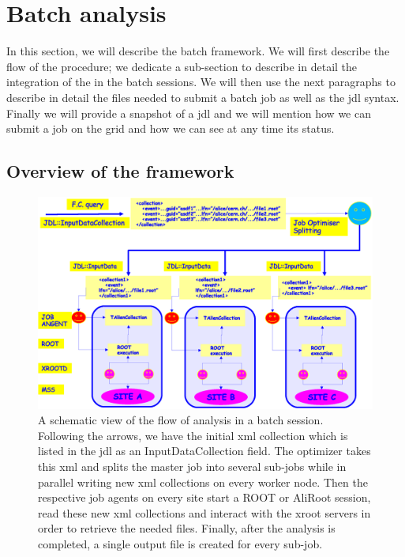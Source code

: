 \section{Batch analysis}
\label{Note:BATCH}

In this section, we will describe the batch framework. We will first describe the flow of the procedure; we dedicate a sub-section to describe in detail the integration of the \tag in the batch sessions. We will then use the next paragraphs to describe in detail the files needed to submit a batch job as well as the jdl syntax. Finally we will provide a snapshot of a jdl and we will mention how we can submit a job on the grid and how we can see at any time its status.

\subsection{Overview of the framework}

\begin{figure}[ht!]
\begin{center}
\includegraphics[height=0.5\textheight,width=0.7\textheight]{figures/Batch1.eps}
\end{center}
\caption{A schematic view of the flow of analysis in a batch session. Following the arrows, we have the initial xml collection which is listed in the jdl as an {\ttfamily InputDataCollection} field. The optimizer takes this xml and splits the master job into several sub-jobs while in parallel writing new xml collections on every worker node. Then the respective job agents on every site start a ROOT or AliRoot session, read these new xml collections and interact with the xroot servers in order to retrieve the needed files. Finally, after the analysis is completed, a single output file is created for every sub-job.}
\label{Note:FigAnalsysisFlowBatch}
\end{figure}

